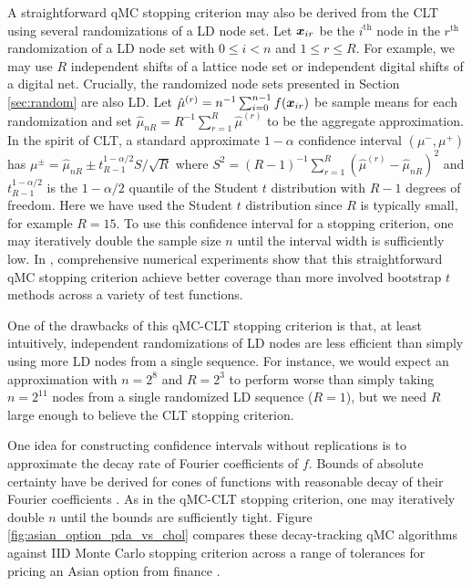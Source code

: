 \documentclass{svproc}
\newcounter{algorithm}%
\begin{document}
A straightforward qMC stopping criterion may also be derived from the CLT using several randomizations of a LD node set. Let ${\boldsymbol{x}}_{ir}$ be the $i^\mathrm{th}$ node in the $r^\mathrm{th}$ randomization of a LD node set with $0 \leq i < n$ and $1 \leq r \leq R$. For example, we may use $R$ independent shifts of a lattice node set or independent digital shifts of a digital net. Crucially, the randomized node sets presented in Section \ref{sec:random} are also LD. Let $\hat{\mu}^{(r)} = n^{-1} \sum_{i=0}^{n-1} f({\boldsymbol{x}}_{ir})$ be sample means for each randomization and set $\hat{\mu}_{nR} = R^{-1} \sum_{r=1}^R \hat{\mu}^{(r)}$ to be the aggregate approximation. In the spirit of CLT, a standard approximate $1-\alpha$ confidence interval $(\mu^-,\mu^+)$ has $\mu^\pm = \hat{\mu}_{nR} \pm t_{R-1}^{1-\alpha/2} S/\sqrt{R}$ where $S^2 = (R-1)^{-1} \sum_{r=1}^R (\hat{\mu}^{(r)} - \hat{\mu}_{nR})^2$ and $t_{R-1}^{1-\alpha/2}$ is the $1-\alpha/2$ quantile of the Student $t$ distribution with $R-1$ degrees of freedom. Here we have used the Student $t$ distribution since $R$ is typically small, for example $R=15$. To use this confidence interval for a stopping criterion, one may iteratively double the sample size $n$ until the interval width is sufficiently low. In \cite{l2023confidence}, comprehensive numerical experiments show that this straightforward qMC stopping criterion achieve better coverage than more involved bootstrap $t$ methods across a variety of test functions. 

One of the drawbacks of this qMC-CLT stopping criterion is that, at least intuitively, independent randomizations of LD nodes are less efficient than simply using more LD nodes from a single sequence. For instance, we would expect an approximation with $n=2^8$ and $R=2^3$ to perform worse than simply taking $n=2^{11}$ nodes from a single randomized LD sequence ($R=1$), but we need $R$ large enough to believe the CLT stopping criterion. 

One idea for constructing confidence intervals without replications is to approximate the decay rate of Fourier coefficients of $f$. Bounds of absolute certainty have be derived for cones of functions with reasonable decay of their Fourier coefficients \cite{HicEtal17a}. As in the qMC-CLT stopping criterion, one may iteratively double $n$ until the bounds are sufficiently tight. Figure \ref{fig:asian_option_pda_vs_chol} compares these decay-tracking qMC algorithms against IID Monte Carlo stopping criterion across a range of tolerances for pricing an Asian option from finance \cite[p.\ 8]{Gla03}.
\end{document}
